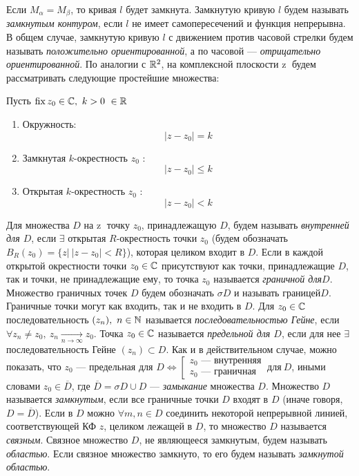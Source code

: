 \documentclass[../../main.tex]{subfiles}
\begin{document}
Если  $M_{\alpha} = M_{\beta}$, то кривая $l$ будет замкнута. 
Замкнутую кривую  $l$ будем называть \emph{замкнутым контуром},
если $l$ не имеет самопересечений и функция непрерывна. В общем
случае, замкнутую кривую  $l$ с движением против часовой стрелки
будем называть \emph{положительно ориентированной}, 
а по часовой ---
\emph{отрицательно ориентированной}. По аналогии  с $\mathbb{R}^2$,
 на комплексной плоскости  \textcircled{z} будем рассматривать 
следующие  простейшие множества:

Пусть $\operatorname{fix}{z_0}\in \mathbb{C},\   k>0\ \in \mathbb{R}$
\begin{enumerate}
\item Окружность: \[  |z - z_0| = k\] 
\item Замкнутая $k$-окрестность $z_0$ : \[ |z - z_0| \leq k\] 
\item Открытая $k$-окрестность $z_0$ : \[ |z - z_0| < k\] 
\end{enumerate}

Для множества $D$ на \textcircled{z} точку $z_0$, принадлежащую  $D$, 
будем называть \emph{внутренней для  $D$}, если $\exists$ открытая 
$R$-окрестность точки $z_0$ (будем обозначать 
$B_R(z_0) = \{ z |\  |z - z_0| < R \}$), которая целиком входит в  $D$.
Если в каждой открытой окрестности точки 
$z_0 \in \mathbb{C}$ присутствуют как точки, принадлежащие $D$, 
так и точки, не принадлежащие ему, то точка $z_0$ называется 
\emph{граничной для$D$}.
Множество граничных точек $D$ будем обозначать $\sigma\!{D}$ и 
называть границей$D$.
Граничные точки могут как входить, так и не входить в $D$. Для $z_0 \in \mathbb{C}$
последовательность
$(z_n),\ n\in\mathbb{N}$ называется \emph{последовательностью Гейне}, если $\forall
z_n\neq z_0, \ z_n \underset{n \longrightarrow \infty}{\longrightarrow} z_0 $.
 Точка $z_0 \in \mathbb{C}$ называется \emph{предельной для $D$},
если для нее $\exists$ последовательность Гейне $(z_n) \subset D$. Как и в
действительном случае, можно показать,
 что $z_0$ --- предельная для $D \iff
 \left[\begin{aligned} 
  z_0 \text{ --- внутренняя} \\
  z_0 \text{ --- граничная}
\end{aligned}\right. \ \text{для}\ D$, иными словами $z_0 \in \overline{D}$, где
$\overline{D} = \sigma\!{D}\cup D$ --- \emph{замыкание} множества $D$.
 Множество $D$ называется \emph{замкнутым}, если все граничные точки $D$
 входят в $D$ (иначе говоря, $D = \overline{D}$). 
Если в $D$ можно $\forall m, n \in D$ соединить некоторой непрерывной линией,
соответствующей
 КФ $z$, целиком лежащей в $D$, то множество $D$ называется  \emph{связным}.
Связное множество $D$, не являющееся замкнутым, будем называть \emph{областью}.
Если связное множество замкнуто, то его будем называть \emph{замкнутой
областью}.
 
\end{document}
